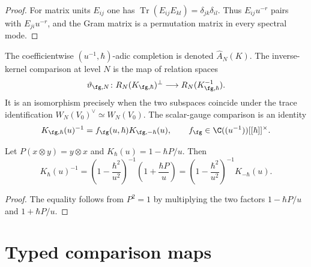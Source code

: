 \begin{proof}
For matrix units $E_{ij}$ one has
$\operatorname{Tr}(E_{ij}E_{kl})=\delta_{jk}\delta_{il}$.
Thus $E_{ij}u^{-r}$ pairs with $E_{ji}u^{-r}$, and the Gram
matrix is a permutation matrix in every spectral mode.
\end{proof}

\begin{definition}
\label{def:finite-rtt-window-spectral-completion}
The coefficientwise $(u^{-1},\hbar)$-adic completion is denoted
$\widehat A_N(K)$.  The inverse-kernel comparison at level $N$ is the
map of relation spaces
\begin{equation}\label{eq:exceptional-inverse-kernel-comparison}
\vartheta_{\fg,N}\colon
R_N(K_{\fg,\hbar})^\perp
\longrightarrow R_N(K_{\fg,\hbar}^{-1}).
\end{equation}
It is an isomorphism precisely when the two subspaces coincide under
the trace identification $W_N(V_0)^\vee\simeq W_N(V_0)$.
The scalar-gauge comparison is an identity
\begin{equation}\label{eq:exceptional-scalar-gauge}
K_{\fg,\hbar}(u)^{-1}
=f_{\fg}(u,\hbar)K_{\fg,-\hbar}(u),
\qquad
f_{\fg}\in\C((u^{-1}))[[\hbar]]^\times.
\end{equation}
\end{definition}

\begin{lemma}
Let $P(x\otimes y)=y\otimes x$ and
$K_\hbar(u)=1-\hbar P/u$.  Then
\[
K_\hbar(u)^{-1}
=\left(1-\frac{\hbar^2}{u^2}\right)^{-1}
\left(1+\frac{\hbar P}{u}\right)
=\left(1-\frac{\hbar^2}{u^2}\right)^{-1}K_{-\hbar}(u).
\]
\end{lemma}

\begin{proof}
The equality follows from $P^2=1$ by multiplying the two factors
$1-\hbar P/u$ and $1+\hbar P/u$.
\end{proof}

\section{Typed comparison maps}
\label{sec:exceptional-yangian-taxa}

